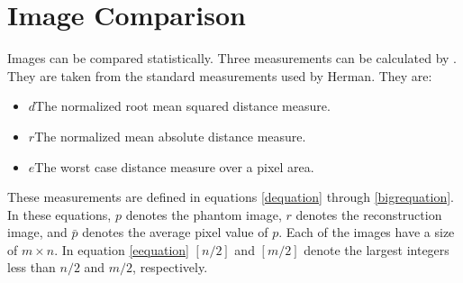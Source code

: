 \section{Image Comparison}\label{conceptimagecompare}
Images can be compared statistically. Three measurements can be calculated
by \ctsim. They are taken from the standard measurements used by
Herman\cite{HERMAN80}. They are:

\begin{itemize}\itemsep=0pt
\item[]\textbf{$d$}\quad The normalized root mean squared distance measure.
\item[]\textbf{$r$}\quad The normalized mean absolute distance measure.
\item[]\textbf{$e$}\quad The worst case distance measure over a  pixel area.
\end{itemize}

These measurements are defined in equations \ref{dequation} through \ref{bigrequation}.
In these equations, $p$ denotes the phantom image, $r$ denotes the reconstruction
image, and $\bar{p}$ denotes the average pixel value of $p$. Each of the images have a
size of $m \times n$. In equation \ref{eequation} $[n/2]$ and $[m/2]$ denote the largest
integers less than $n/2$ and $m/2$, respectively.

%
{}
\begin{comment}
\end{comment}
